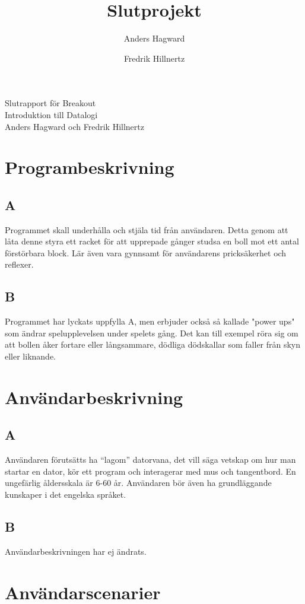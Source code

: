\documentclass[11pt,a4paper]{article}
\author{Anders Hagward \and Fredrik Hillnertz}
\title{Slutprojekt}
\begin{document}
\thispagestyle{empty}
\begin{center}
\Huge Slutrapport för Breakout \\
\Large Introduktion till Datalogi \\
\normalsize Anders Hagward och Fredrik Hillnertz
\end{center}
\newpage

\tableofcontents
\newpage

\section{Programbeskrivning}

\subsection{A}
Programmet skall underhålla och stjäla tid från användaren. Detta genom att låta denne styra ett racket för att upprepade gånger studsa en boll mot ett antal förstörbara block. Lär även vara gynnsamt för användarens pricksäkerhet och reflexer.

\subsection{B}
Programmet har lyckats uppfylla A, men erbjuder också så kallade "power ups" som ändrar spelupplevelsen under spelets gång. Det kan till exempel röra sig om att bollen åker fortare eller långsammare, dödliga dödskallar som faller från skyn eller liknande.

\section{Användarbeskrivning}

\subsection{A}
Användaren förutsätts ha ``lagom'' datorvana, det vill säga vetskap om hur man startar en dator, kör ett program och interagerar med mus och tangentbord. En ungefärlig åldersskala är 6-60 år. Användaren bör även ha grundläggande kunskaper i det engelska språket.

\subsection{B}
Användarbeskrivningen har ej ändrats.

\section{Användarscenarier}
\end{document}
